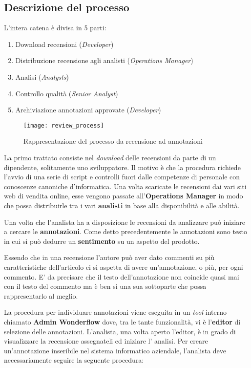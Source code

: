 \subsection{Descrizione del processo}
\label{subsec:processo_recensioni_annotazioni}
L'intera catena è divisa in 5 parti:
\begin{enumerate}
  \item Download recensioni (\textit{Developer})
  \item Distribuzione recensione agli analisti (\textit{Operations Manager})
  \item Analisi (\textit{Analysts})
  \item Controllo qualità (\textit{Senior Analyst})
  \item Archiviazione annotazioni approvate (\textit{Developer})
\end{enumerate}

\begin{figure}[ht]
\begin{center}
\texttt{[image: review\_process]}
\caption{Rappresentazione del processo da recensione ad annotazioni}
\label{fig:review_process}
\end{center}
\end{figure}

La primo trattato consiste nel \textit{download} delle recensioni da parte di
un dipendente, solitamente uno sviluppatore. Il motivo è che la procedura
richiede l'avvio di una serie di \gls{script} e controlli fuori dalle
competenze di personale con conoscenze canoniche d'informatica.
Una volta scaricate le recensioni dai vari siti web di vendita online, esse
vengono passate all'\textbf{Operations Manager} in modo che possa distribuirle
tra i vari \textbf{analisti} in base alla disponibilità e alle abilità.

Una volta che l'analista ha a disposizione le recensioni da analizzare può
iniziare a cercare le \textbf{annotazioni}. Come detto precedentemente le
annotazioni sono testo in cui si può dedurre un \textbf{sentimento} su un
aspetto del prodotto.

Essendo che in una recensione l'autore può aver dato commenti su più 
caratteristiche dell'articolo ci si aspetta di avere un'annotazione, o più, per
ogni commento. E' da precisare che il testo dell'annotazione non coincide quasi
mai con il testo del commento ma è ben si una sua sottoparte che possa
rappresentarlo al meglio.

La procedura per individuare annotazioni viene eseguita in un \textit{tool}
interno chiamato \textbf{Admin Wonderflow} dove, tra le tante funzionalità, vi è
l'\textbf{editor} di selezione delle annotazioni. L'analista, una volta aperto
l'editor, è in grado di visualizzare la recensione assegnateli ed iniziare l'
analisi. Per creare un'annotazione inseribile nel sistema informatico aziendale, 
l'analista deve necessariamente seguire la seguente procedura:

